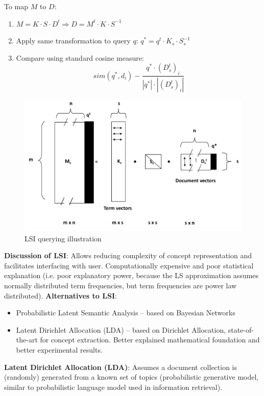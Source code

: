     To map $M$ to $D$:
    \begin{enumerate}
      \item $M=K\cdot S\cdot D^t \Rightarrow D = M^t\cdot K\cdot S^{-1}$
      \item Apply same transformation to query $q$: $q^* = q^t\cdot K_s\cdot S_s^{-1}$
      \item Compare using standard cosine measure: $$sim(q^*, d_i)-\frac{q^*\cdot(D_s^t)_i}{|q^*|\cdot|(D_s^t)_i|}$$
    \end{enumerate}

    \begin{figure}[htp]
      \centering
        \includegraphics[width=.7\textwidth]{images/LSIq.png}
        \caption{LSI querying illustration}
        \label{fig:LSIq}
    \end{figure}

    \textbf{Discussion of LSI}: Allows reducing complexity of concept representation and facilitates interfacing with user. Computationally expensive and poor statistical explanation (i.e. poor explanatory power, because the LS approximation assumes normally distributed term frequencies, but term frequencies are power law distributed). \textbf{Alternatives to LSI}:
    \begin{itemize}
      \item Probabilistic Latent Semantic Analysis -- based on Bayesian Networks
      \item Latent Dirichlet Allocation (LDA) -- based on Dirichlet Allocation, state-of-the-art for concept extraction. Better explained mathematical foundation and better experimental results.
    \end{itemize}

    \textbf{Latent Dirichlet Allocation (LDA)}: Assumes a document collection is (randomly) generated from a known set of topics (probabilistic generative model, similar to probabilistic language model used in information retrieval).

